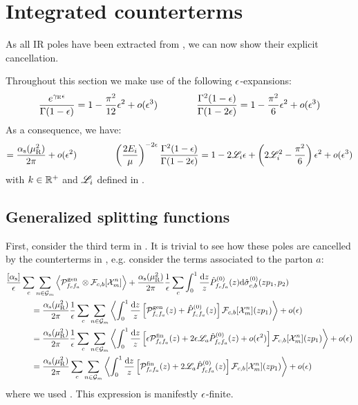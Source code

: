 \section{Integrated counterterms}

As all IR poles have been extracted from , we can now show their explicit cancellation.

Throughout this section we make use of the following $ \epsilon $-expansions:
\begin{equation}
  \frac{e^{\gamma_\text{E}\epsilon}}{\Gamma(1-\epsilon)} = 1 - \frac{\pi^2}{12} \epsilon^2 + o(\epsilon^3)
  \qquad \qquad
  \frac{\Gamma^2(1-\epsilon)}{\Gamma(1-2\epsilon)} = 1 - \frac{\pi^2}{6} \epsilon^2 + o(\epsilon^3)
\end{equation}
As a consequence, we have:
\begin{equation}
  [\rc] = \frac{\rcr}{2\pi} + \smo(\de^2)
  \qquad \qquad
  \left( \frac{2E_i}{\mu} \right)^{-2\de} \frac{\Gamma^2(1-\de)}{\Gamma(1-2\de)} = 1 - 2\ler_i \de + \left( 2\ler_i^2 - \frac{\pi^2}{6} \right) \de^2 + \smo(\de^3)
\end{equation}
with $ k \in \mathbb{R}^+ $ and $ \mathscr{L}_i $ defined in .

\subsection{Generalized splitting functions}

First, consider the third term in . It is trivial to see how these poles are cancelled by the counterterms in , e.g. consider the terms associated to the parton $ a $:
\begin{equation*}
  \begin{split}
    & \frac{[\alpha_\text{s}]}{\epsilon} \sum_c \sum_{n \in \mathcal{G}_m} \left\langle \mathcal{P}^\text{gen}_{f_c f_a} \otimes \mathcal{F}_{c,b}[\mathcal{X}^{n}_{m}] \right\rangle + \frac{\alpha_\text{s}(\mu_\text{R}^2)}{2\pi} \frac{1}{\epsilon} \sum_c \int_0^1 \frac{\mathrm{d} z}{z} \hat{P}^{(0)}_{f_c f_a}(z) \mathrm{d}\hat{\sigma}^{(0)}_{c,b}(zp_1 , p_2) \\
    & \qquad \quad = \frac{\alpha_\text{s}(\mu_\text{R}^2)}{2\pi} \frac{1}{\epsilon} \sum_c \sum_{n \in \mathcal{G}_m} \left\langle \int_0^1 \frac{\mathrm{d} z}{z} \left[ \mathcal{P}^\text{gen}_{f_c f_a}(z) + \hat{P}^{(0)}_{f_c f_a}(z) \right] \mathcal{F}_{c,b}[\mathcal{X}^{n}_{m}](zp_1) \right\rangle + o(\epsilon) \\
    & \qquad \quad = \frac{\alpha_\text{s}(\mu_\text{R}^2)}{2\pi} \frac{1}{\epsilon} \sum_c \sum_{n \in \mathcal{G}_m} \left\langle \int_0^1 \frac{\mathrm{d} z}{z} \left[ \epsilon \mathcal{P}^\text{fin}_{f_c f_a}(z) + 2 \epsilon \mathscr{L}_a \hat{P}^{(0)}_{f_c f_a}(z) + o(\epsilon^2) \right] \mathcal{F}_{c,b}[\mathcal{X}^{n}_{m}](zp_1) \right\rangle + o(\epsilon) \\
    & \qquad \quad = \frac{\alpha_\text{s}(\mu_\text{R}^2)}{2\pi} \sum_c \sum_{n \in \mathcal{G}_m} \left\langle \int_0^1 \frac{\mathrm{d} z}{z} \left[ \mathcal{P}^\text{fin}_{f_c f_a}(z) + 2 \mathscr{L}_a \hat{P}^{(0)}_{f_c f_a}(z) \right] \mathcal{F}_{c,b}[\mathcal{X}^{n}_{m}](zp_1) \right\rangle + o(\epsilon) \\
  \end{split}
\end{equation*}
where we used . This expression is manifestly $ \epsilon $-finite.

